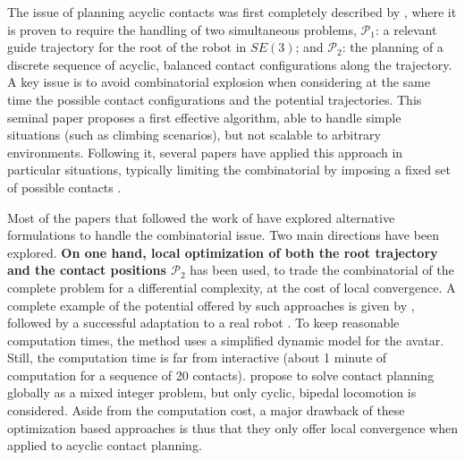 The issue of planning acyclic contacts was first completely described by \citeauthor{conf/iser/BretlRLKA04}, where  it is proven to require the handling of two simultaneous problems, $\mathcal{P}_1$: a relevant guide trajectory for the root of the robot in $SE(3)$; and $\mathcal{P}_2$: the planning of a discrete sequence of acyclic, balanced contact configurations along the trajectory.  A key issue is to avoid combinatorial explosion when considering at the same time the possible contact configurations and the potential trajectories. This seminal paper proposes a first effective algorithm, able to handle simple situations (such as climbing scenarios), but not scalable to arbitrary environments. Following it, seve\-ral papers have applied this approach in particular situations, typically limiting the combinatorial by imposing a fixed set of possible contacts \citep{Hauser06usingmotion, stilman2010}.

Most of the papers that followed the work of \citeauthor{conf/iser/BretlRLKA04} have explored alternative formulations to handle the combinatorial issue. Two main directions have been explored. \textbf{On one hand, local optimization of both the root trajectory \Pa and the contact positions $\mathcal{P}_2$} has been used, to trade the combinatorial of the complete problem for a differential complexity, at the cost of local convergence. A complete example of the potential offered by such approaches is given by \cite{Mordatch:2012:DCB:2185520.2185539}, followed by a successful adaptation to a real robot \citep{mordatch2015}. To keep reasonable computation times, the method uses a simplified dynamic model for the avatar. Still, the computation time is far from interactive  (about 1 minute of computation for a sequence of 20 contacts). \cite{DBLP:conf/humanoids/DeitsT14} propose to solve contact planning globally as a mixed integer problem, but only cyclic, bipedal locomotion is considered. Aside from the computation cost, a major drawback of these optimization based approaches is thus that they only offer local convergence when applied to acyclic contact planning.


